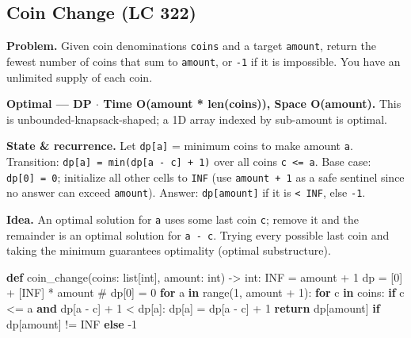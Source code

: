 \documentclass[11pt]{article}
\newenvironment{Shaded}{\begin{snugshade}}{\end{snugshade}}
\newcommand{\BuiltInTok}[1]{\textcolor[rgb]{0.50,0.55,0.55}{#1}}
\newcommand{\CommentTok}[1]{\textcolor[rgb]{0.48,0.49,0.49}{#1}}
\newcommand{\ControlFlowTok}[1]{\textcolor[rgb]{0.99,0.74,0.29}{\textbf{#1}}}
\newcommand{\DecValTok}[1]{\textcolor[rgb]{0.96,0.45,0.00}{#1}}
\newcommand{\KeywordTok}[1]{\textcolor[rgb]{0.81,0.81,0.76}{\textbf{#1}}}
\newcommand{\NormalTok}[1]{\textcolor[rgb]{0.81,0.81,0.76}{#1}}
\newcommand{\OperatorTok}[1]{\textcolor[rgb]{0.81,0.81,0.76}{#1}}
\begin{document}
\subsection{Coin Change (LC 322)}\label{coin-change-lc-322}

\textbf{Problem.} Given coin denominations \texttt{coins} and a target \texttt{amount}, return the fewest number of coins that sum to \texttt{amount}, or \texttt{-1} if it is impossible. You have an unlimited supply of each coin.

\textbf{Optimal --- DP \(\cdot\) Time O(amount * len(coins)), Space O(amount).} This is unbounded-knapsack-shaped; a 1D array indexed by sub-amount is optimal.

\textbf{State \& recurrence.} Let \texttt{dp{[}a{]}} = minimum coins to make amount \texttt{a}. Transition: \texttt{dp{[}a{]}\ =\ min(dp{[}a\ -\ c{]}\ +\ 1)} over all coins \texttt{c\ \textless{}=\ a}. Base case: \texttt{dp{[}0{]}\ =\ 0}; initialize all other cells to \texttt{INF} (use \texttt{amount\ +\ 1} as a safe sentinel since no answer can exceed \texttt{amount}). Answer: \texttt{dp{[}amount{]}} if it is \texttt{\textless{}\ INF}, else \texttt{-1}.

\textbf{Idea.} An optimal solution for \texttt{a} uses some last coin \texttt{c}; remove it and the remainder is an optimal solution for \texttt{a\ -\ c}. Trying every possible last coin and taking the minimum guarantees optimality (optimal substructure).


\begin{Shaded}
\begin{Highlighting}[]
\KeywordTok{def}\NormalTok{ coin\_change(coins: }\BuiltInTok{list}\NormalTok{[}\BuiltInTok{int}\NormalTok{], amount: }\BuiltInTok{int}\NormalTok{) }\OperatorTok{{-}\textgreater{}} \BuiltInTok{int}\NormalTok{:}
\NormalTok{    INF }\OperatorTok{=}\NormalTok{ amount }\OperatorTok{+} \DecValTok{1}
\NormalTok{    dp }\OperatorTok{=}\NormalTok{ [}\DecValTok{0}\NormalTok{] }\OperatorTok{+}\NormalTok{ [INF] }\OperatorTok{*}\NormalTok{ amount          }\CommentTok{\# dp[0] = 0}
    \ControlFlowTok{for}\NormalTok{ a }\KeywordTok{in} \BuiltInTok{range}\NormalTok{(}\DecValTok{1}\NormalTok{, amount }\OperatorTok{+} \DecValTok{1}\NormalTok{):}
        \ControlFlowTok{for}\NormalTok{ c }\KeywordTok{in}\NormalTok{ coins:}
            \ControlFlowTok{if}\NormalTok{ c }\OperatorTok{\textless{}=}\NormalTok{ a }\KeywordTok{and}\NormalTok{ dp[a }\OperatorTok{{-}}\NormalTok{ c] }\OperatorTok{+} \DecValTok{1} \OperatorTok{\textless{}}\NormalTok{ dp[a]:}
\NormalTok{                dp[a] }\OperatorTok{=}\NormalTok{ dp[a }\OperatorTok{{-}}\NormalTok{ c] }\OperatorTok{+} \DecValTok{1}
    \ControlFlowTok{return}\NormalTok{ dp[amount] }\ControlFlowTok{if}\NormalTok{ dp[amount] }\OperatorTok{!=}\NormalTok{ INF }\ControlFlowTok{else} \OperatorTok{{-}}\DecValTok{1}
\end{Highlighting}
\end{Shaded}
\end{document}
